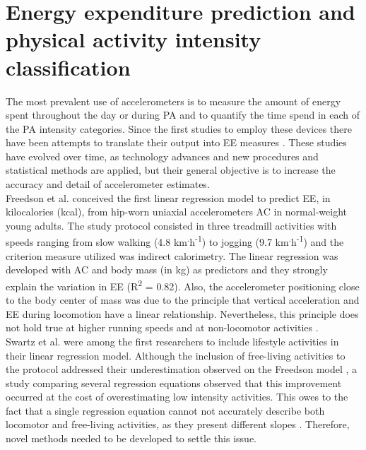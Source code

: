 \documentclass[11pt]{article}
\begin{document}
\section*{Energy expenditure prediction and physical activity intensity classification}

The most prevalent use of accelerometers is to measure the amount of energy spent throughout the day or during PA and to quantify the time spend in each of the PA intensity categories. Since the first studies to employ these devices there have been attempts to translate their output into EE measures \cite{Wong_1981, Montoye_1983}. These studies have evolved over time, as technology advances and new procedures and statistical methods are applied, but their general objective is to increase the accuracy and detail of accelerometer estimates. \\

Freedson et al. \citeyear{Freedson_1998} conceived the first linear regression model to predict EE, in kilocalories (kcal), from hip-worn uniaxial accelerometers AC in normal-weight young adults. The study protocol consisted in three treadmill activities with speeds ranging from slow walking (4.8 km\textsuperscript{.}h\textsuperscript{-1}) to jogging (9.7 km\textsuperscript{.}h\textsuperscript{-1}) and the criterion measure utilized was indirect calorimetry. The linear regression was developed with AC and body mass (in kg) as predictors and they strongly explain the variation in EE  (R\textsuperscript{2} = 0.82). Also, the accelerometer positioning close to the body center of mass was due to the principle that vertical acceleration and EE during locomotion have a linear relationship. Nevertheless, this principle does not hold true at higher running speeds and at non-locomotor activities \cite{Lyden_2012}. \\

Swartz et al. \citeyear{Swartz_2000} were among the first researchers to include lifestyle activities in their linear regression model. Although the inclusion of free-living activities to the protocol addressed their underestimation observed on the Freedson model \citeyear{Freedson_1998}, a study comparing several regression equations \cite{Lyden_2012} observed that this improvement occurred at the cost of overestimating low intensity activities. This owes to the fact that a single regression equation cannot not accurately describe both locomotor and free-living activities, as they present different slopes \cite{Crouter_2006}. Therefore, novel methods needed to be developed to settle this issue. \\
\end{document}

